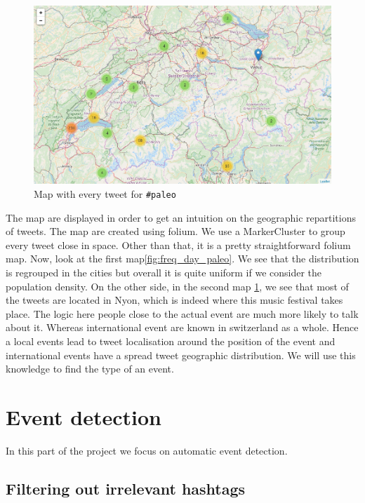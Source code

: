 \documentclass[11pt]{article}
\begin{document}
\begin{figure}[htbp]
  \vspace*{-1mm}
  \centering
  \includegraphics[width=\columnwidth]{figures/map_paleo.png}
  \vspace{-5mm}
  \caption{Map with every tweet for \texttt{\#paleo}}
  \label{fig:map_paleo}
\end{figure}

The map are displayed in order to get an intuition on the geographic repartitions of tweets. The map are created using folium. We use a MarkerCluster to group every tweet close in space. Other than that, it is a pretty straightforward folium map. Now, look at the first map\ref{fig:freq_day_paleo}. We see that the distribution is regrouped in the cities but overall it is quite uniform if we consider the population density. On the other side, in the second map \ref{fig:map_paleo}, we see that most of the tweets are located in Nyon, which is indeed where this music festival takes place. The logic here people close to the actual event are much more likely to talk about it. Whereas international event are known in switzerland as a whole. Hence a local events lead to tweet localisation around the position of the event and international events have a spread tweet geographic distribution. We will use this knowledge to find the type of an event.


\section{Event detection}

In this part of the project we focus on automatic event detection.

\subsection{Filtering out irrelevant hashtags}
\end{document}
